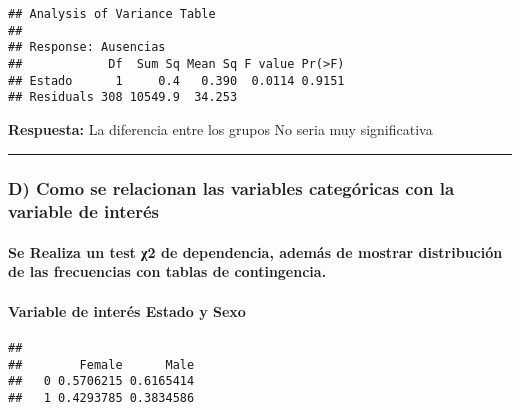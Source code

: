 \documentclass[
]{article}
\newenvironment{Shaded}{\begin{snugshade}}{\end{snugshade}}
\newcommand{\DecValTok}[1]{\textcolor[rgb]{0.00,0.00,0.81}{#1}}
\newcommand{\FunctionTok}[1]{\textcolor[rgb]{0.00,0.00,0.00}{#1}}
\newcommand{\NormalTok}[1]{#1}
\newcommand{\SpecialCharTok}[1]{\textcolor[rgb]{0.00,0.00,0.00}{#1}}
\begin{document}
\begin{verbatim}
## Analysis of Variance Table
## 
## Response: Ausencias
##            Df  Sum Sq Mean Sq F value Pr(>F)
## Estado      1     0.4   0.390  0.0114 0.9151
## Residuals 308 10549.9  34.253
\end{verbatim}

\textbf{Respuesta:} La diferencia entre los grupos No seria muy
significativa

\begin{center}\rule{0.5\linewidth}{0.5pt}\end{center}

\hypertarget{d-como-se-relacionan-las-variables-categuxf3ricas-con-la-variable-de-interuxe9s}{%
\subsubsection{D) Como se relacionan las variables categóricas con la
variable de
interés}\label{d-como-se-relacionan-las-variables-categuxf3ricas-con-la-variable-de-interuxe9s}}

\hypertarget{se-realiza-un-test-ux3c72-de-dependencia-ademuxe1s-de-mostrar-distribuciuxf3n-de-las-frecuencias-con-tablas-de-contingencia.}{%
\paragraph{Se Realiza un test χ2 de dependencia, además de mostrar
distribución de las frecuencias con tablas de
contingencia.}\label{se-realiza-un-test-ux3c72-de-dependencia-ademuxe1s-de-mostrar-distribuciuxf3n-de-las-frecuencias-con-tablas-de-contingencia.}}

\hypertarget{variable-de-interuxe9s-estado-y-sexo}{%
\paragraph{Variable de interés Estado y
Sexo}\label{variable-de-interuxe9s-estado-y-sexo}}

\begin{Shaded}
\end{Shaded}

\begin{verbatim}
##    
##        Female      Male
##   0 0.5706215 0.6165414
##   1 0.4293785 0.3834586
\end{verbatim}
\end{document}

